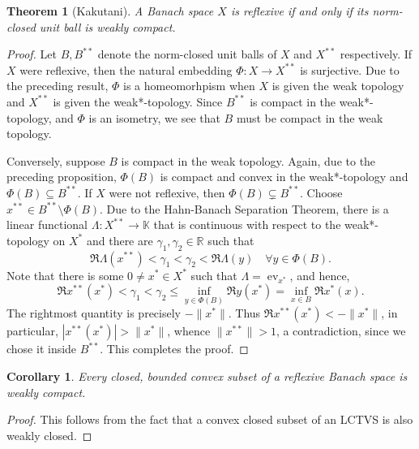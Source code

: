 \documentclass[12pt]{article}
\theoremstyle{thmstyle}
\newtheorem{theorem}{Theorem}[section]
\theoremstyle{defstyle}
\newtheorem*{corollary}{Corollary}
\newcommand{\R}{\mathbb{R}}
\newcommand{\bbC}{\mathbb{C}}
\newcommand{\K}{\mathbb{K}} %
\newcommand{\ev}{\operatorname{ev}}
\renewcommand{\le}{\leqslant}
\begin{document}
\begin{theorem}[Kakutani]
    A Banach space $X$ is reflexive if and only if its norm-closed unit ball is weakly compact.
\end{theorem}
\begin{proof}
    Let $B, B^{\ast\ast}$ denote the norm-closed unit balls of $X$ and $X^{\ast\ast}$ respectively. If $X$ were reflexive, then the natural embedding $\Phi:X\to X^{\ast\ast}$ is surjective. Due to the preceding result, $\Phi$ is a homeomorhpism when $X$ is given the weak topology and $X^{\ast\ast}$ is given the weak*-topology. Since $B^{\ast\ast}$ is compact in the weak*-topology, and $\Phi$ is an isometry, we see that $B$ must be compact in the weak topology.

    Conversely, suppose $B$ is compact in the weak topology. Again, due to the preceding proposition, $\Phi(B)$ is compact and convex in the weak*-topology and $\Phi(B)\subseteq B^{\ast\ast}$. If $X$ were not reflexive, then $\Phi(B)\subsetneq B^{\ast\ast}$. Choose $x^{\ast\ast}\in B^{\ast\ast}\setminus\Phi(B)$. Due to the Hahn-Banach Separation Theorem, there is a linear functional $\Lambda: X^{\ast\ast}\to\K$ that is continuous with respect to the weak*-topology on $X^\ast$ and there are $\gamma_1,\gamma_2\in\R$ such that 
    \begin{equation*}
        \Re\Lambda(x^{\ast\ast}) < \gamma_1 < \gamma_2 < \Re\Lambda(y)\quad\forall y\in \Phi(B).
    \end{equation*}
    Note that there is some $0\ne x^\ast\in X^\ast$ such that $\Lambda = \ev_{x^\ast}$, and hence, 
    \begin{equation*}
        \Re x^{\ast\ast}(x^\ast) < \gamma_1 < \gamma_2\le\inf_{y\in\Phi(B)}\Re y(x^\ast) = \inf_{x\in B} \Re x^\ast(x).
    \end{equation*}
    The rightmost quantity is precisely $-\|x^\ast\|$. Thus $\Re x^{\ast\ast}(x^\ast) < -\|x^\ast\|$, in particular, $|x^{\ast\ast}(x^\ast)| > \|x^\ast\|$, whence $\|x^{\ast\ast}\| > 1$, a contradiction, since we chose it inside $B^{\ast\ast}$. This completes the proof.
\end{proof}

\begin{corollary}
    Every closed, bounded convex subset of a reflexive Banach space is weakly compact.
\end{corollary}
\begin{proof}
    This follows from the fact that a convex closed subset of an LCTVS is also weakly closed.
\end{proof}
\end{document}
